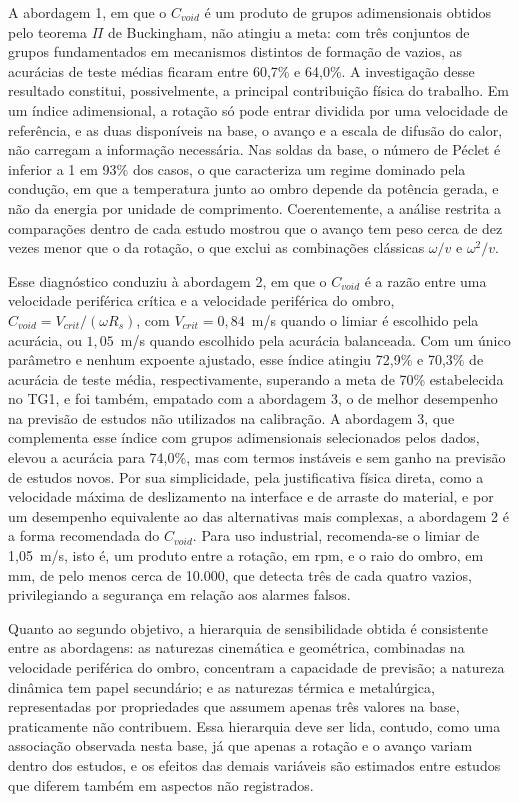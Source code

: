 \documentclass[12pt,openany]{report}
\begin{document}
A abordagem 1, em que o $C_{void}$ é um produto de grupos adimensionais obtidos pelo teorema $\Pi$ de Buckingham, não atingiu a meta: com três conjuntos de grupos fundamentados em mecanismos distintos de formação de vazios, as acurácias de teste médias ficaram entre 60,7\% e 64,0\%. A investigação desse resultado constitui, possivelmente, a principal contribuição física do trabalho. Em um índice adimensional, a rotação só pode entrar dividida por uma velocidade de referência, e as duas disponíveis na base, o avanço e a escala de difusão do calor, não carregam a informação necessária. Nas soldas da base, o número de Péclet é inferior a 1 em 93\% dos casos, o que caracteriza um regime dominado pela condução, em que a temperatura junto ao ombro depende da potência gerada, e não da energia por unidade de comprimento. Coerentemente, a análise restrita a comparações dentro de cada estudo mostrou que o avanço tem peso cerca de dez vezes menor que o da rotação, o que exclui as combinações clássicas $\omega/v$ e $\omega^{2}/v$.

Esse diagnóstico conduziu à abordagem 2, em que o $C_{void}$ é a razão entre uma velocidade periférica crítica e a velocidade periférica do ombro, $C_{void} = V_{crit}/(\omega R_s)$, com $V_{crit} = 0{,}84$~m/s quando o limiar é escolhido pela acurácia, ou $1{,}05$~m/s quando escolhido pela acurácia balanceada. Com um único parâmetro e nenhum expoente ajustado, esse índice atingiu 72,9\% e 70,3\% de acurácia de teste média, respectivamente, superando a meta de 70\% estabelecida no TG1, e foi também, empatado com a abordagem 3, o de melhor desempenho na previsão de estudos não utilizados na calibração. A abordagem 3, que complementa esse índice com grupos adimensionais selecionados pelos dados, elevou a acurácia para 74,0\%, mas com termos instáveis e sem ganho na previsão de estudos novos. Por sua simplicidade, pela justificativa física direta, como a velocidade máxima de deslizamento na interface e de arraste do material, e por um desempenho equivalente ao das alternativas mais complexas, a abordagem 2 é a forma recomendada do $C_{void}$. Para uso industrial, recomenda-se o limiar de 1,05~m/s, isto é, um produto entre a rotação, em rpm, e o raio do ombro, em mm, de pelo menos cerca de 10.000, que detecta três de cada quatro vazios, privilegiando a segurança em relação aos alarmes falsos.

Quanto ao segundo objetivo, a hierarquia de sensibilidade obtida é consistente entre as abordagens: as naturezas cinemática e geométrica, combinadas na velocidade periférica do ombro, concentram a capacidade de previsão; a natureza dinâmica tem papel secundário; e as naturezas térmica e metalúrgica, representadas por propriedades que assumem apenas três valores na base, praticamente não contribuem. Essa hierarquia deve ser lida, contudo, como uma associação observada nesta base, já que apenas a rotação e o avanço variam dentro dos estudos, e os efeitos das demais variáveis são estimados entre estudos que diferem também em aspectos não registrados.
\end{document}
